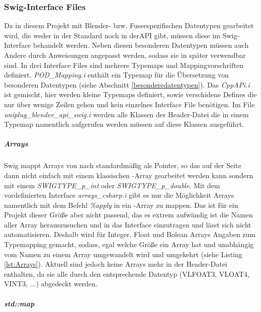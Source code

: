 \subsubsection{Swig-Interface Files}\label{subsubsec:swiginterface}
Da in diesem Projekt mit Blender- bzw. Fuseespezifischen Datentypen gearbeitet wird, die weder in der Standard \CC noch in der\CS API gibt, müssen diese im Swig-Interface behandelt werden. Neben diesen besonderen Datentypen müssen auch Andere durch Anweisungen angepasst werden, sodass sie in \CS später verwendbar sind. In drei Interface Files sind mehrere Typemaps und Mappingvorschriften definiert. \emph{POD\_Mapping.i} enthält ein Typemap für die Übersetzung von besonderen Datentypen (siehe Abschnitt \ref{besonderedatentypen}). Das \emph{CppAPi.i} ist gemischt, hier werden kleine Typemaps definiert, sowie verschidene Defines die nur über wenige Zeilen gehen und kein einzelnes Interface File benötigen. Im File \emph{uniplug\_blender\_api\_swig.i} werden alle Klassen der Header-Datei die in einem Typemap namentlich aufgerufen werden müssen auf diese Klassen ausgeführt.

\subparagraph{Arrays}
Swig mappt Arrays von \CC nach \CS standardmäßig als Pointer, so das auf der \CS Seite dann nicht einfach mit einem klassischen \CS-Array gearbeitet werden kann sondern mit einem \emph{SWIGTYPE\_p\_int} oder \emph{SWIGTYPE\_p\_double}. Mit dem vordefinierten Interface \emph{arrays\_csharp.i} gibt es nur die Möglichkeit Arrays namentlich mit dem Befehl \emph{\%apply} in ein \CS-Array zu mappen. Das ist für ein Projekt dieser Größe aber nicht passend, das es extrem aufwändig ist die Namen aller Array herauszusuchen und in das Interface einzutragen und lässt sich nicht automatisieren. Deshalb wird für Integer, Float und Bolean Arrays Angaben zum Typemapping gemacht, sodass, egal welche Größe ein Array hat und unabhängig vom Namen zu einem \CS Array umgewandelt wird und umgekehrt (siehe Listing \ref{lst:Arrays}). Aktuell sind jedoch keine Arrays mehr in der Header-Datei enthalten, da sie alle durch den entsprechende Datentyp (VLFOAT3, VLOAT4, VINT3, ...) abgedeckt werden.

\begin{code}[caption={Beispiel Arraymapping},label={lst:Arrays}, escapechar=|]
\end{code}

\subparagraph{std::map}

